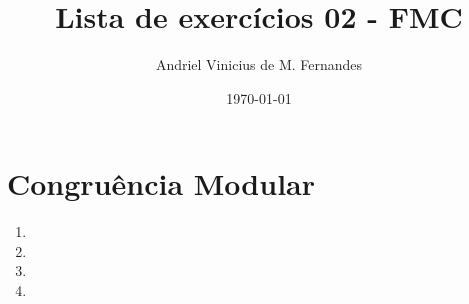 \documentclass[12pt]{article}
\title{Lista de exercícios 02 - FMC}
\author{Andriel Vinicius de M. Fernandes}
\date{\today}
\begin{document}
\maketitle
\section{Congruência Modular}
\begin{enumerate}
	\item 
	\item 
	\item 
	\item 
\end{enumerate}
\end{document}
